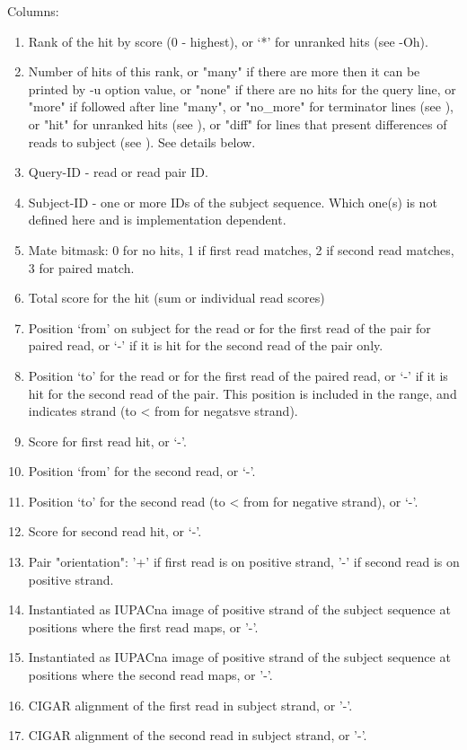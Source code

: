 \documentclass[english]{article}
\begin{document}
    Columns:
\begin{enumerate}
\item   Rank of the hit by score (0 - highest), 
        or `*' for unranked hits (see -Oh).
\item Number of hits of this rank, or "many" if there are more then it
        can be printed by -u option value, or "none" if there are no hits for 
        the query line, or "more" if followed after line "many", or "no_more"
        for terminator lines (see ), or "hit" for unranked hits (see ),
        or "diff" for lines that present differences of reads to subject 
        (see ). See details below.
\item  Query-ID - read or read pair ID.
\item  Subject-ID - one or more IDs of the subject sequence. Which one(s) is 
        not defined here and is implementation dependent.
\item  Mate bitmask: 0 for no hits, 1 if first read matches, 2 if second
        read matches, 3 for paired match.
\item  Total score for the hit (sum or individual read scores)
\item  Position `from' on subject for the read or for the first read of the 
        pair for paired read, or `-' if it is hit for the second read of the 
        pair only.
\item  Position `to' for the read or for the first read of the paired read,
        or `-' if it is hit for the second read of the pair. This position is
        included in the range, and indicates strand (to < from for negatsve 
        strand). 
\item   Score for first read hit, or `-'.
\item Position `from' for the second read, or `-'.
\item Position `to' for the second read (to < from for negative strand), 
        or `-'.
\item Score for second read hit, or `-'.
\item Pair "orientation": '+' if first read is on positive strand, '-'
        if second read is on positive strand.
\item Instantiated as IUPACna image of positive strand of the subject 
        sequence at positions where the first read maps, or '-'.
\item Instantiated as IUPACna image of positive strand of the subject 
        sequence at positions where the second read maps, or '-'.
\item CIGAR alignment of the first read in subject strand, or '-'. 
\item CIGAR alignment of the second read in subject strand, or '-'.
\end{enumerate}
\end{document}
